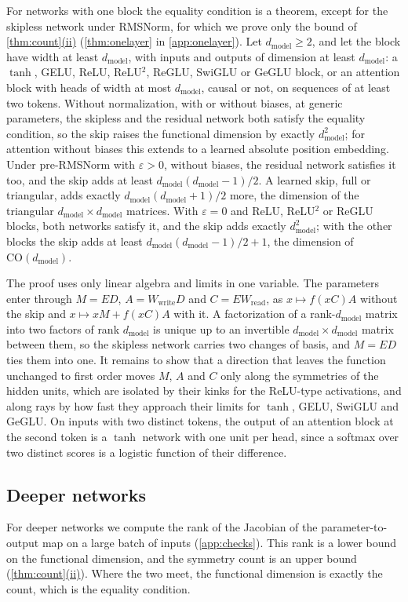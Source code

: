 \documentclass[10pt]{article}
\theoremstyle{definition}
\theoremstyle{remark}
\newcommand{\Wread}{W_{\mathrm{read}}}
\newcommand{\Wwrite}{W_{\mathrm{write}}}
\newcommand{\dm}{d_{\mathrm{model}}}
\newcommand{\CO}{\mathrm{CO}}
\DeclareRobustCommand{\cpref}[2]{\hyperref[#1:#2]{\cref*{#1}(#2)}}
\begin{document}
For networks with one block the equality condition is a theorem, except for the skipless network under RMSNorm, for which we prove only the bound of \cpref{thm:count}{ii} (\cref{thm:onelayer} in \cref{app:onelayer}). Let $\dm \ge 2$, and let the block have width at least $\dm$, with inputs and outputs of dimension at least $\dm$: a $\tanh$, GELU, ReLU, ReLU$^2$, ReGLU, SwiGLU or GeGLU block, or an attention block with heads of width at most $\dm$, causal or not, on sequences of at least two tokens. Without normalization, with or without biases, at generic parameters, the skipless and the residual network both satisfy the equality condition, so the skip raises the functional dimension by exactly $\dm^2$; for attention without biases this extends to a learned absolute position embedding. Under pre-RMSNorm with $\varepsilon > 0$, without biases, the residual network satisfies it too, and the skip adds at least $\dm(\dm-1)/2$. A learned skip, full or triangular, adds exactly $\dm(\dm+1)/2$ more, the dimension of the triangular $\dm\times\dm$ matrices. With $\varepsilon = 0$ and ReLU, ReLU$^2$ or ReGLU blocks, both networks satisfy it, and the skip adds exactly $\dm^2$; with the other blocks the skip adds at least $\dm(\dm-1)/2 + 1$, the dimension of $\CO(\dm)$.

The proof uses only linear algebra and limits in one variable. The parameters enter through $M = ED$, $A = \Wwrite D$ and $C = E\Wread$, as $x \mapsto f(xC)A$ without the skip and $x \mapsto xM + f(xC)A$ with it. A factorization of a rank-$\dm$ matrix into two factors of rank $\dm$ is unique up to an invertible $\dm \times \dm$ matrix between them, so the skipless network carries two changes of basis, and $M = ED$ ties them into one. It remains to show that a direction that leaves the function unchanged to first order moves $M$, $A$ and $C$ only along the symmetries of the hidden units, which are isolated by their kinks for the ReLU-type activations, and along rays by how fast they approach their limits for $\tanh$, GELU, SwiGLU and GeGLU. On inputs with two distinct tokens, the output of an attention block at the second token is a $\tanh$ network with one unit per head, since a softmax over two distinct scores is a logistic function of their difference.

\subsection{Deeper networks}\label{sec:measured}

For deeper networks we compute the rank of the Jacobian of the parameter-to-output map on a large batch of inputs (\cref{app:checks}). This rank is a lower bound on the functional dimension, and the symmetry count is an upper bound (\cpref{thm:count}{ii}). Where the two meet, the functional dimension is exactly the count, which is the equality condition.
\end{document}
